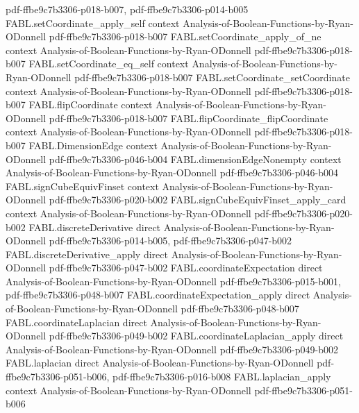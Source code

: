 \begin{theorem}
  {pdf-ffbe9c7b3306-p018-b007,
    pdf-ffbe9c7b3306-p014-b005}
\proofstep
  {FABL.setCoordinate_apply_self}
  {context}
  {Analysis-of-Boolean-Functions-by-Ryan-ODonnell}
  {pdf-ffbe9c7b3306-p018-b007}
\proofstep
  {FABL.setCoordinate_apply_of_ne}
  {context}
  {Analysis-of-Boolean-Functions-by-Ryan-ODonnell}
  {pdf-ffbe9c7b3306-p018-b007}
\proofstep
  {FABL.setCoordinate_eq_self}
  {context}
  {Analysis-of-Boolean-Functions-by-Ryan-ODonnell}
  {pdf-ffbe9c7b3306-p018-b007}
\proofstep
  {FABL.setCoordinate_setCoordinate}
  {context}
  {Analysis-of-Boolean-Functions-by-Ryan-ODonnell}
  {pdf-ffbe9c7b3306-p018-b007}
\proofstep
  {FABL.flipCoordinate}
  {context}
  {Analysis-of-Boolean-Functions-by-Ryan-ODonnell}
  {pdf-ffbe9c7b3306-p018-b007}
\proofstep
  {FABL.flipCoordinate_flipCoordinate}
  {context}
  {Analysis-of-Boolean-Functions-by-Ryan-ODonnell}
  {pdf-ffbe9c7b3306-p018-b007}
\proofstep
  {FABL.DimensionEdge}
  {context}
  {Analysis-of-Boolean-Functions-by-Ryan-ODonnell}
  {pdf-ffbe9c7b3306-p046-b004}
\proofstep
  {FABL.dimensionEdgeNonempty}
  {context}
  {Analysis-of-Boolean-Functions-by-Ryan-ODonnell}
  {pdf-ffbe9c7b3306-p046-b004}
\proofstep
  {FABL.signCubeEquivFinset}
  {context}
  {Analysis-of-Boolean-Functions-by-Ryan-ODonnell}
  {pdf-ffbe9c7b3306-p020-b002}
\proofstep
  {FABL.signCubeEquivFinset_apply_card}
  {context}
  {Analysis-of-Boolean-Functions-by-Ryan-ODonnell}
  {pdf-ffbe9c7b3306-p020-b002}
\proofstep
  {FABL.discreteDerivative}
  {direct}
  {Analysis-of-Boolean-Functions-by-Ryan-ODonnell}
  {pdf-ffbe9c7b3306-p014-b005,
    pdf-ffbe9c7b3306-p047-b002}
\proofstep
  {FABL.discreteDerivative_apply}
  {direct}
  {Analysis-of-Boolean-Functions-by-Ryan-ODonnell}
  {pdf-ffbe9c7b3306-p047-b002}
\proofstep
  {FABL.coordinateExpectation}
  {direct}
  {Analysis-of-Boolean-Functions-by-Ryan-ODonnell}
  {pdf-ffbe9c7b3306-p015-b001,
    pdf-ffbe9c7b3306-p048-b007}
\proofstep
  {FABL.coordinateExpectation_apply}
  {direct}
  {Analysis-of-Boolean-Functions-by-Ryan-ODonnell}
  {pdf-ffbe9c7b3306-p048-b007}
\proofstep
  {FABL.coordinateLaplacian}
  {direct}
  {Analysis-of-Boolean-Functions-by-Ryan-ODonnell}
  {pdf-ffbe9c7b3306-p049-b002}
\proofstep
  {FABL.coordinateLaplacian_apply}
  {direct}
  {Analysis-of-Boolean-Functions-by-Ryan-ODonnell}
  {pdf-ffbe9c7b3306-p049-b002}
\proofstep
  {FABL.laplacian}
  {direct}
  {Analysis-of-Boolean-Functions-by-Ryan-ODonnell}
  {pdf-ffbe9c7b3306-p051-b006,
    pdf-ffbe9c7b3306-p016-b008}
\proofstep
  {FABL.laplacian_apply}
  {context}
  {Analysis-of-Boolean-Functions-by-Ryan-ODonnell}
  {pdf-ffbe9c7b3306-p051-b006}

\end{theorem}
